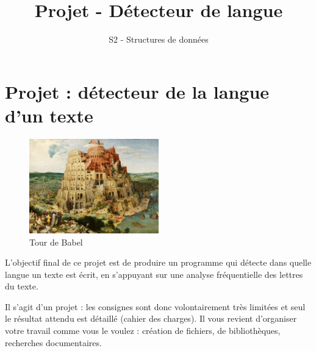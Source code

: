 \documentclass[
  a4paper,
  DIV=11,
  numbers=noendperiod]{scrartcl}
\title{Projet - Détecteur de langue}
\subtitle{S2 - Structures de données}
\author{}
\date{}
\begin{document}
\maketitle
{}  \chead{} \cfoot{}   \renewcommand{\headrulewidth}{0pt} \renewcommand{\footrulewidth}{0pt} \thispagestyle{fancy} \vspace{-3cm}

\ifdefined\Shaded\renewenvironment{Shaded}{\begin{tcolorbox}[frame hidden, enhanced, boxrule=0pt, sharp corners, breakable, interior hidden, borderline west={3pt}{0pt}{shadecolor}]}{\end{tcolorbox}}\fi

\hypertarget{projet-duxe9tecteur-de-la-langue-dun-texte}{%
\section{Projet : détecteur de la langue d'un
texte}\label{projet-duxe9tecteur-de-la-langue-dun-texte}}

\begin{figure}

{\centering \includegraphics[width=0.5\textwidth,height=\textheight]{Pieter_Bruegel_the_Elder_-_The_Tower_of_Babel_(Vienna)_-_Google_Art_Project_-_edited.jpg}

}

\caption{Tour de Babel}

\end{figure}

L'objectif final de ce projet est de produire un programme qui détecte
dans quelle langue un texte est écrit, en s'appuyant sur une analyse
fréquentielle des lettres du texte.

Il s'agit d'un projet : les consignes sont donc volontairement très
limitées et seul le résultat attendu est détaillé (cahier des charges).
Il vous revient d'organiser votre travail comme vous le voulez :
création de fichiers, de bibliothèques, recherches documentaires.
\end{document}
